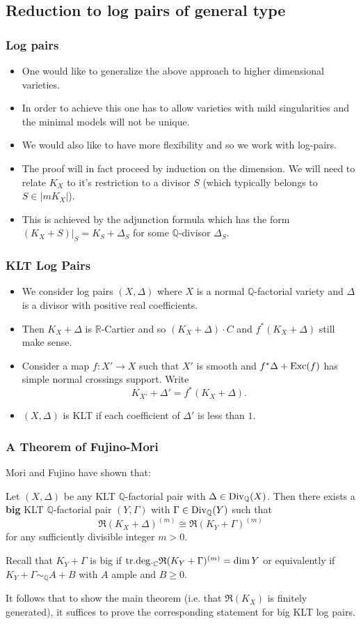 \documentclass{beamer}
\theoremstyle{plain}
\theoremstyle{definition}
\theoremstyle{remark}
\def\Q{\mathbb {Q}}
\begin{document}
\subsection{Reduction to log pairs of general type}
\begin{frame}
 \frametitle{Log pairs}

\begin{itemize}
\item One would like to generalize the above approach to 
higher dimensional varieties.
\item In order to achieve this one has to allow varieties with mild singularities and the minimal models will not be unique.
\item We would also like to have more flexibility and so we work
with log-pairs.
\item The proof will in fact proceed by induction on the dimension.
We will need to relate $K_X$ to it's restriction to a divisor $S$ (which typically belongs to $S\in |mK_X|$).
\item This is achieved by the adjunction formula which has the form
$(K_X+S)|_S=K_S+\Delta _S$ for some $\Q$-divisor $\Delta _S$. 
\end{itemize}
\end{frame}
\begin{frame}
 \frametitle{KLT Log Pairs}
\begin{itemize}
\item We consider log pairs $(X,\Delta )$ where $X$ is a normal $\Q$-factorial variety and $\Delta$ is a divisor with positive real coefficients.
\item Then $K_X+\Delta$ is $\mathbb{R}$-Cartier and so $(K_X+\Delta )\cdot C$ and
$f^*(K_X+\Delta )$ still make sense.
\item Consider a map $f:X'\to X$ such that $X'$ is smooth and $f^* \Delta +{\rm Exc}(f)$ has simple normal crossings support.
Write $$K_{X'}+\Delta '=f^*(K_X+\Delta ).$$
\item $(X,\Delta )$ is KLT if each coefficient of $\Delta '$ is less than $1$.
\end{itemize}
\end{frame}
\begin{frame}
 \frametitle{A Theorem of Fujino-Mori}
Mori and Fujino have shown that:
\begin{theorem} Let $(X,\Delta )$ be any KLT $\Q$-factorial pair with 
$\Delta \in {\rm Div }_\Q (X)$. Then there exists a {\bf big} KLT $\Q$-factorial 
pair $(Y,\Gamma )$ with $\Gamma \in {\rm Div }_\Q (Y)$ such that
$$\mathfrak{R}(K_X+\Delta )^{(m)}\cong \mathfrak{R}(K_Y+\Gamma )^{(m)}$$
for any sufficiently divisible integer $m>0$.
\end{theorem}
Recall that $K_Y+\Gamma$ is big if ${\rm tr.deg.}_{\mathbb C}\mathfrak{R}(K_Y+\Gamma )^{(m)}=\dim Y$ or equivalently if $K_Y+\Gamma\sim _\Q A+B$ with $A$ ample and $B\geq 0$.

It follows that to show the main theorem (i.e. that $\mathfrak{R}(K_X)$ 
is finitely generated), it suffices to prove the corresponding statement 
for big KLT log pairs.
\end{frame}
\end{document}
